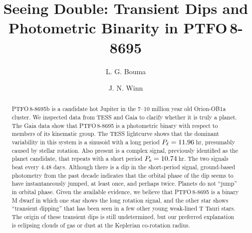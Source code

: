 \documentclass[12pt,twocolumn,tighten]{aastex62}
\begin{document}

\title{Seeing Double: Transient Dips and Photometric Binarity in
PTFO$\,$8-8695}


%
%
\author[0000-0002-0514-5538]{L. G. Bouma}
%
\author[0000-0002-4265-047X]{J. N. Winn}

\begin{abstract}
  PTFO$\,$8-8695b is a candidate hot Jupiter in the 7--10 million year
  old Orion-OB1a cluster. We inspected data from TESS and Gaia to
  clarify whether it is truly a planet.  The Gaia data show that
  PTFO$\,$8-8695 is a photometric binary with respect to members of
  its kinematic group.  The TESS lightcurve shows that the dominant
  variability in this system is a sinusoid with a long period
  $P_{\rm \ell}=11.96\,$hr, presumably caused by stellar rotation.
  Also present is a complex signal, previously identified as the
  planet candidate, that repeats with a short period $P_{\rm s}=
  10.74\,$hr.  The two signals beat every 4.48 days.  Although there
  is a dip in the short-period signal, ground-based photometry from
  the past decade indicates that the orbital phase of the dip seems to
  have instantaneously jumped, at least once, and perhaps twice.
  Planets do not ``jump'' in orbital phase.  Given the available
  evidence, we believe that PTFO$\,$8-8695 is a binary M dwarf in
  which one star shows the long rotation signal, and the other star
  shows ``transient dipping'' that has been seen in a few other young
  weak-lined T Tauri stars.  The origin of these transient dips is
  still undetermined, but our preferred explanation is eclipsing
  clouds of gas or dust at the Keplerian co-rotation radius.
\end{abstract}

\end{document}
